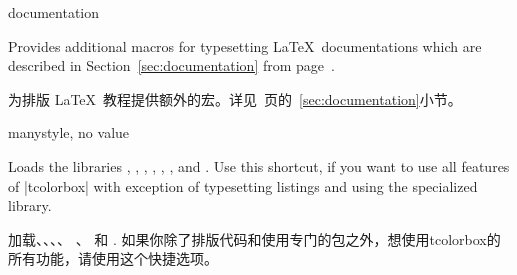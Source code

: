 

\begin{docTcbKey}[library]{documentation}{}{}

Provides additional macros for typesetting \LaTeX\ documentations
which are described in Section~\ref{sec:documentation}
from page~\pageref{sec:documentation}. 

为排版 \LaTeX\ 教程提供额外的宏。详见~\pageref{sec:documentation}页的~\ref{sec:documentation}小节。

\end{docTcbKey}



\begin{docTcbKey}[library]{many}{}{style, no value}

Loads the libraries , , , ,
, , and .
Use this shortcut, if you want to use all features of |tcolorbox|
with exception of typesetting listings and using
the specialized  library.

加载、、、、%
、 和 .%
如果你除了排版代码和使用专门的包之外，想使用tcolorbox的所有功能，请使用这个快捷选项。

\end{docTcbKey}

% 
% 

% 
% 

